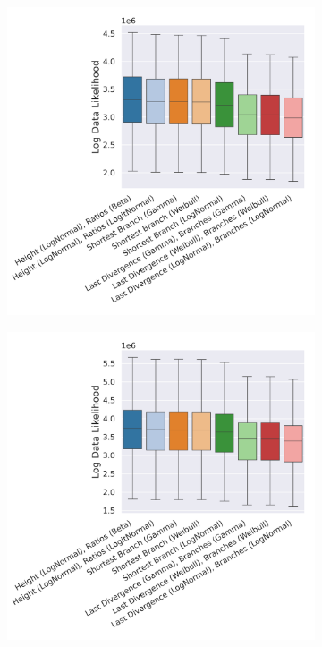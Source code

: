 \documentclass[10pt,letterpaper]{article}
\begin{document}
\begin{figure}
	\caption{The log data likelihoods for the different distributions and datasets. (The higher the better.)}
	
	\centering
	\begin{subfigure}[b]{0.45\textwidth}
		\centering
		\includegraphics[width=\textwidth]{figures/yule-100-ccd1-likelihood.png}
	\end{subfigure}
	\begin{subfigure}[b]{0.45\textwidth}
		\centering
		\includegraphics[width=\textwidth]{figures/yule-200-ccd1-likelihood.png}
	\end{subfigure}
	

\end{figure}
\end{document}
